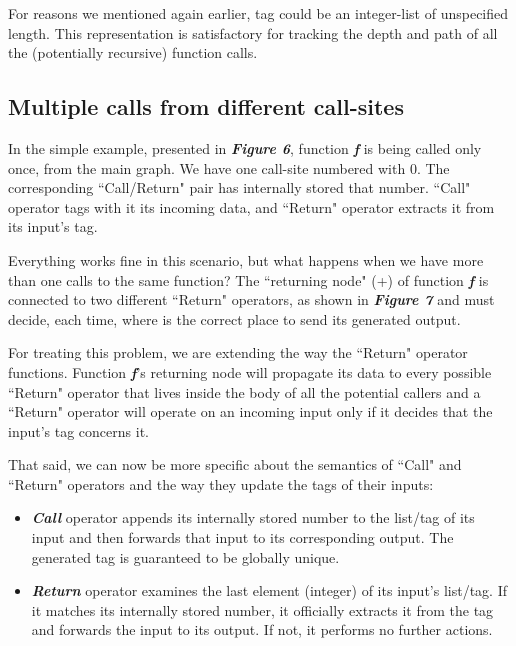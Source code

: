 \documentclass[ack,preface]{dithesis}
\begin{document}
For reasons we mentioned again earlier, tag could be an integer-list of unspecified length. This representation is satisfactory for tracking the depth and path of all the (potentially recursive) function calls.

\subsection{Multiple calls from different call-sites}
In the simple example, presented in \textit{\textbf{Figure 6}}, function \textit{\textbf{f}} is being called only once, from the main graph. We have one call-site numbered with 0. The corresponding ``Call/Return" pair has internally stored that number. ``Call" operator tags with it its incoming data, and ``Return" operator extracts it from its input's tag. 

Everything works fine in this scenario, but what happens when we have more than one calls to the same function? 
The ``returning node" (+) of function  \textit{\textbf{f}} is connected to  two different ``Return" operators, as shown in \textit{\textbf{Figure 7}} and must decide, each time,  where is the correct place to send its generated output.

For treating this problem, we are extending the way the ``Return" operator functions.  Function \textit{\textbf{f}}'s returning node will  propagate its data to every possible ``Return" operator that lives inside the body of all the potential callers and a ``Return" operator will operate on an incoming input only if it decides that the input's tag concerns it.

That said, we can now be more specific about the semantics of  ``Call" and ``Return" operators and the way they update the tags of their inputs:
    \begin{itemize}
    \item \textit{\textbf{Call }} operator appends its internally stored number to the list/tag of its input and then forwards that input to its corresponding output. The generated tag is guaranteed to be globally unique.
    \item \textit{\textbf{Return }} operator examines the last element (integer) of its input's list/tag. If it matches its internally stored number, it officially extracts it from the tag and forwards the input to its output. If not,  it performs no further actions.
    \end{itemize}
\end{document}
